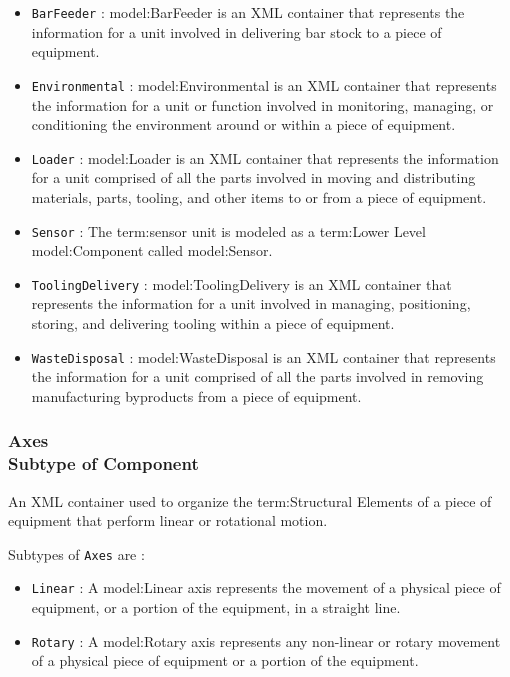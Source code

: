 \begin{itemize}
\item \texttt{BarFeeder} : {model:BarFeeder} is an XML container that represents the information for a unit involved in delivering bar stock to a piece of equipment.

\item \texttt{Environmental} : {model:Environmental} is an XML container that represents the information for a unit or function involved in monitoring, managing, or conditioning the environment around or within a piece of equipment.

\item \texttt{Loader} : {model:Loader} is an XML container that represents the information for a unit comprised of all the parts involved in moving and distributing materials, parts, tooling, and other items to or from a piece of equipment.

\item \texttt{Sensor} : The {term:sensor unit} is modeled as a {term:Lower Level} {model:Component} called {model:Sensor}.

\item \texttt{ToolingDelivery} : {model:ToolingDelivery} is an XML container that represents the information for a unit involved in managing, positioning, storing, and delivering tooling within a piece of equipment.


\item \texttt{WasteDisposal} : {model:WasteDisposal} is an XML container that represents the information for a unit comprised of all the parts involved in removing manufacturing byproducts from a piece of equipment.


\end{itemize}

\FloatBarrier
\subsubsection[Axes]{Axes \\ {\small Subtype of Component}}
  \label{type:Axes}

\FloatBarrier

An XML container used to organize the {term:Structural Elements} of a piece of equipment that perform linear or rotational motion.

Subtypes of \texttt{Axes} are :

\begin{itemize}
\item \texttt{Linear} : A {model:Linear} axis represents the movement of a physical piece of equipment, or a portion of the equipment, in a straight line. 

\item \texttt{Rotary} : A {model:Rotary} axis represents any non-linear or rotary movement of a physical piece of equipment or a portion of the equipment.

\end{itemize}

